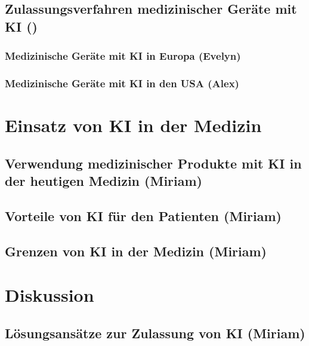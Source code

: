 \documentclass[a4paper, 11pt]{article}
\begin{document}
		\subsection{Zulassungsverfahren medizinischer Geräte mit KI \small{()}}\label{sec:medproductsAI}
						
			\subsubsection{Medizinische Geräte mit KI in Europa \small{(Evelyn)}}\label{sec:europe-with-ai}
				
			\subsubsection{Medizinische Geräte mit KI in den USA \small{(Alex)}}\label{sec:us-with-ai}
				
				
				

	\newpage
	\section{Einsatz von KI in der Medizin}\label{sec:analysis}
				
			\subsection{Verwendung medizinischer Produkte mit KI in der heutigen Medizin \small{(Miriam)}}\label{sec:ki-today}
				
			\subsection{Vorteile von KI für den Patienten \small{(Miriam)}}\label{sec:ki-advantages}
				
			\subsection{Grenzen von KI in der Medizin  \small{(Miriam)}}\label{sec:ki-limitations}
				
	\newpage
	\section{Diskussion}\label{sec:discussion}
		
		\subsection{Lösungsansätze zur Zulassung von KI  \small{(Miriam)}} \label{sec:solutions}
			
\end{document}
